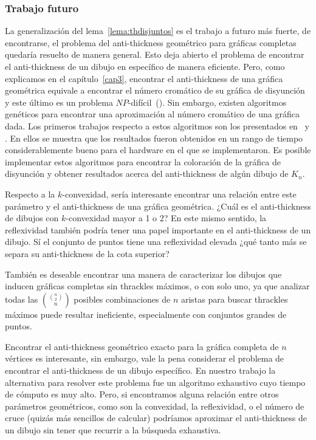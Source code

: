 \subsubsection{Trabajo futuro}

La generalización del lema~\ref{lema:thdisjuntos} es el trabajo a futuro más fuerte, de encontrarse, el
problema del anti-thickness geométrico para gráficas completas quedaría resuelto de manera general. Esto
deja abierto el problema de encontrar el anti-thickness de un dibujo en específico de manera eficiente.
Pero, como explicamos en el capítulo~\ref{cap3}, encontrar el anti-thickness de una gráfica geométrica
equivale a encontrar el número cromático de su gráfica de disyunción y este último es un problema
$NP$-difícil~(\cite{Skiena2003}). Sin embargo, existen algoritmos genéticos para encontrar una aproximación
al número cromático de una gráfica dada. Los primeros trabajos respecto a estos algoritmos son los
presentados en~\cite{Fleurent1996} y \cite{Galinier1999}. En ellos se muestra que los resultados fueron
obtenidos en un rango de tiempo considerablemente bueno para el hardware en el que se implementaron. Es
posible implementar estos algoritmos para encontrar la coloración de la gráfica de disyunción y obtener
resultados acerca del anti-thickness de algún dibujo de $K_n$.

Respecto a la $k$-convexidad, sería interesante encontrar una relación entre este parámetro y el
anti-thickness de una gráfica geométrica. ¿Cuál es el anti-thickness de dibujos con $k$-convexidad mayor a
1 o 2? En este mismo sentido, la reflexividad también podría tener una papel importante en el
anti-thickness de un dibujo. Sí el conjunto de puntos tiene una reflexividad elevada ¿qué tanto más se
separa su anti-thickness de la cota superior?

También es deseable encontrar una manera de caracterizar los dibujos que inducen gráficas completas sin
thrackles máximos, o con solo uno, ya que analizar todas las $\displaystyle \binom{\binom{n}{2}}{n}$
posibles combinaciones de $n$ aristas para buscar thrackles máximos puede resultar ineficiente,
especialmente con conjuntos grandes de puntos.

Encontrar el anti-thickness geométrico exacto para la gráfica completa de $n$ vértices es interesante, sin
embargo, vale la pena considerar el problema de encontrar el anti-thickness de un dibujo específico. En
nuestro trabajo la alternativa para resolver este problema fue un algoritmo exhaustivo cuyo tiempo de
cómputo es muy alto. Pero, si encontramos alguna relación entre otros parámetros geométricos, como
son la convexidad, la reflexividad, o el número de cruce (quizás más sencillos de calcular) podríamos
aproximar el anti-thickness de un dibujo sin tener que recurrir a la búsqueda exhaustiva.
